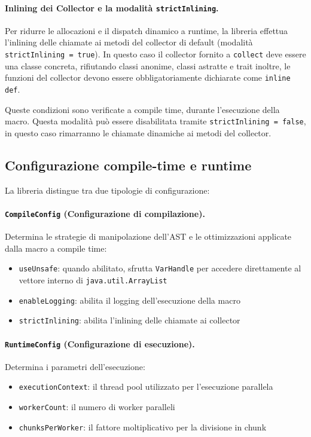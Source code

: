\documentclass[a4paper,11pt]{report}
\theoremstyle{definition}
\begin{document}
\paragraph{Inlining dei Collector e la modalità \texttt{strictInlining}.}
Per ridurre le allocazioni e il dispatch dinamico a runtime, la libreria effettua l'inlining delle chiamate ai metodi del collector di default (modalità \texttt{strictInlining = true}). In questo caso il collector fornito a \texttt{collect} deve essere una classe concreta, rifiutando classi anonime, classi astratte e trait   inoltre, le funzioni del collector devono essere obbligatoriamente dichiarate come \texttt{inline def}.

Queste condizioni sono verificate a compile time, durante l'esecuzione della macro. Questa modalità può essere disabilitata tramite \texttt{strictInlining = false}, in questo caso rimarranno le chiamate dinamiche ai metodi del collector.

\subsection{Configurazione compile-time e runtime}
\label{subsec:configurazione-compile-runtime}

La libreria distingue tra due tipologie di configurazione:

\paragraph{\texttt{CompileConfig} (Configurazione di compilazione).}
Determina le strategie di manipolazione dell'AST e le ottimizzazioni applicate dalla macro a compile time:
\begin{itemize}
  \item \texttt{useUnsafe}: quando abilitato, sfrutta \texttt{VarHandle} per accedere direttamente al vettore interno di \texttt{java.util.ArrayList}
  \item \texttt{enableLogging}: abilita il logging dell'esecuzione della macro
  \item \texttt{strictInlining}: abilita l'inlining delle chiamate ai collector
\end{itemize}

\paragraph{\texttt{RuntimeConfig} (Configurazione di esecuzione).}
Determina i parametri dell'esecuzione:
\begin{itemize}
  \item \texttt{executionContext}: il thread pool utilizzato per l'esecuzione parallela
  \item \texttt{workerCount}: il numero di worker paralleli
  \item \texttt{chunksPerWorker}: il fattore moltiplicativo per la divisione in chunk
\end{itemize}
\end{document}
